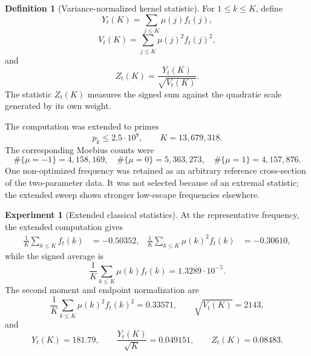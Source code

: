 \documentclass[11pt]{amsart}
\numberwithin{equation}{section}
\theoremstyle{plain}
\theoremstyle{definition}
\newtheorem{definition}[theorem]{Definition}
\newtheorem{experiment}[theorem]{Experiment}
\theoremstyle{remark}
\begin{document}
\begin{definition}[Variance-normalized kernel statistic]
\label{def:classical_kernel_statistics}
For $1\le k\le K$, define
\begin{equation}
Y_t(K)=\sum_{j\le K}\mu(j)f_t(j),
\label{eq:classical_YtK}
\end{equation}
\begin{equation}
V_t(K)=\sum_{j\le K}\mu(j)^2 f_t(j)^2,
\label{eq:classical_VtK}
\end{equation}
and
\begin{equation}
Z_t(K)=\frac{Y_t(K)}{\sqrt{V_t(K)}}.
\label{eq:classical_ZtK}
\end{equation}
The statistic $Z_t(K)$ measures the signed sum against the quadratic
scale generated by its own weight.
\end{definition}

The computation was extended to primes
\begin{equation}
p_k\le 2.5\cdot 10^8,
\qquad
K=13,679,318.
\label{eq:extended_statistics_K}
\end{equation}
The corresponding Moebius counts were
\begin{equation}
\#\{\mu=-1\}=4,158,169,
\quad
\#\{\mu=0\}=5,363,273,
\quad
\#\{\mu=1\}=4,157,876.
\label{eq:extended_statistics_mobius_counts}
\end{equation}
One non-optimized frequency was retained as an arbitrary reference
cross-section of the two-parameter data.  It was not selected because of
an extremal statistic; the extended sweep shows stronger low-escape
frequencies elsewhere.

\begin{experiment}[Extended classical statistics]
\label{exp:extended_classical_statistics}
At the representative frequency, the extended computation gives
\begin{align}
\frac1K\sum_{k\le K}f_t(k)&=-0.50352,
&
\frac1K\sum_{k\le K}\mu(k)^2f_t(k)&=-0.30610,
\label{eq:extended_means_unsigned}\end{align}
while the signed average is
\begin{equation}
\frac1K\sum_{k\le K}\mu(k)f_t(k)=1.3289\cdot 10^{-5}.
\label{eq:extended_mean_signed}
\end{equation}
The second moment and endpoint normalization are
\begin{equation}
\frac1K\sum_{k\le K}\mu(k)^2f_t(k)^2=0.33571,
\qquad
\sqrt{V_t(K)}=2143,
\label{eq:extended_second_moment}
\end{equation}
and
\begin{equation}
Y_t(K)=181.79,
\qquad
\frac{Y_t(K)}{\sqrt K}=0.049151,
\qquad
Z_t(K)=0.08483.
\label{eq:extended_endpoint_values}
\end{equation}
\end{experiment}
\end{document}
